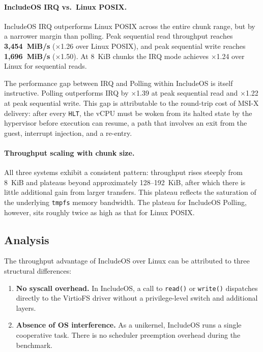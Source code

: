 \documentclass[12pt, a4paper, oneside]{report}
\begin{document}
\paragraph{IncludeOS IRQ vs.\ Linux POSIX.}
IncludeOS IRQ outperforms Linux POSIX across the entire chunk range, but by a
narrower margin than polling.  Peak sequential read throughput reaches
\textbf{3,454~MiB/s} ($\times$1.26 over Linux POSIX), and peak sequential write
reaches \textbf{1,696~MiB/s} ($\times$1.50).  At 8~KiB chunks the IRQ mode
achieves $\times$1.24 over Linux for sequential reads.

The performance gap between IRQ and Polling within IncludeOS is itself
instructive.  Polling outperforms IRQ by $\times$1.39 at peak sequential read
and $\times$1.22 at peak sequential write.  This gap is attributable to the
round-trip cost of MSI-X delivery: after every \texttt{HLT}, the vCPU must be
woken from its halted state by the hypervisor before execution can resume, a path
that involves an exit from the guest, interrupt injection, and a re-entry.

\paragraph{Throughput scaling with chunk size.}
All three systems exhibit a consistent pattern: throughput rises steeply from
8~KiB and plateaus beyond approximately 128--192~KiB, after which there is
little additional gain from larger transfers.  This plateau reflects the
saturation of the underlying \texttt{tmpfs} memory bandwidth.  The plateau for
IncludeOS Polling, however, sits roughly twice as high as that for Linux POSIX.

\subsection{Analysis}

The throughput advantage of IncludeOS over Linux can be attributed to three
structural differences:

\begin{enumerate}
  \item \textbf{No syscall overhead.}  In IncludeOS, a call to \texttt{read()}
    or \texttt{write()} dispatches directly to the VirtioFS driver without a
    privilege-level switch and additional layers.

  \item \textbf{Absence of OS interference.}  As a unikernel, IncludeOS runs a
    single cooperative task. There is no scheduler preemption overhead during the benchmark.
\end{enumerate}
\end{document}
